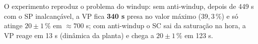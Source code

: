 \begin{res}O experimento reproduz o problema do windup: sem anti-windup, depois de 449 s com o SP inalcançável, a VP fica \textbf{340 s} presa no valor máximo ($39{,}3\,\%$) e só atinge $20\pm1\,\%$ em $\approx700$ s; com anti-windup o SC sai da saturação na hora, a VP reage em 13 s (dinâmica da planta) e chega a $20\pm1\,\%$ em 123 s.\end{res}

